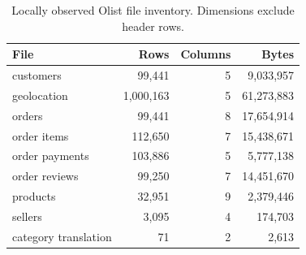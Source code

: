 \documentclass[11pt,a4paper]{article}
\begin{document}
\begin{table}[ht]
\centering\small
\caption{Locally observed Olist file inventory. Dimensions exclude header rows.}
\label{tab:olist-files}
\begin{tabular}{lrrr}
\toprule
File & Rows & Columns & Bytes\\
\midrule
customers & 99,441 & 5 & 9,033,957\\
geolocation & 1,000,163 & 5 & 61,273,883\\
orders & 99,441 & 8 & 17,654,914\\
order items & 112,650 & 7 & 15,438,671\\
order payments & 103,886 & 5 & 5,777,138\\
order reviews & 99,250 & 7 & 14,451,670\\
products & 32,951 & 9 & 2,379,446\\
sellers & 3,095 & 4 & 174,703\\
category translation & 71 & 2 & 2,613\\
\bottomrule
\end{tabular}
\end{table}
\end{document}
